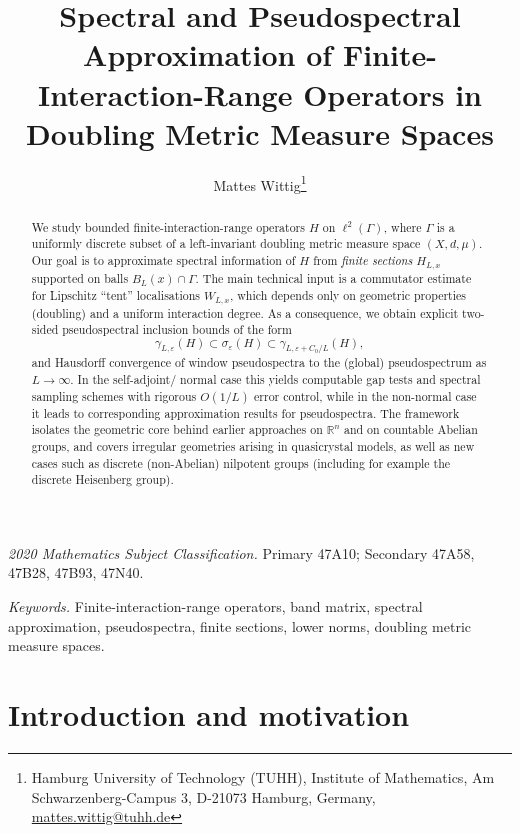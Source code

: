 \documentclass[11pt]{article}
\title{Spectral and Pseudospectral Approximation of Finite-Interaction-Range Operators in Doubling Metric Measure Spaces}
\author{Mattes Wittig\thanks{
  Hamburg University of Technology (TUHH), Institute of Mathematics, Am Schwarzenberg-Campus 3, D-21073 Hamburg, Germany, \href{mailto:mattes.wittig@tuhh.de}{mattes.wittig@tuhh.de}
}}
\date{}
\theoremstyle{definition}
\newcommand{\R}{\mathbb{R}}
\begin{document}
\maketitle

\begin{abstract}
We study bounded finite-interaction-range operators $H$ on $\ell^2(\Gamma)$, where $\Gamma$ is a uniformly discrete subset of a left-invariant doubling metric measure space $(X,d,\mu)$. Our goal is to approximate spectral information of $H$ from \emph{finite sections} $H_{L,x}$ supported on balls $B_L(x)\cap\Gamma$. The main technical input is a commutator estimate for Lipschitz ``tent'' localisations $W_{L,x}$, which depends only on geometric properties (doubling) and a uniform interaction degree. As a consequence, we obtain explicit two-sided pseudospectral inclusion bounds of the form
\[
  \gamma_{L,\varepsilon}(H)\subset \sigma_\varepsilon(H)\subset \gamma_{L,\varepsilon+C_0/L}(H),
\]
and Hausdorff convergence of window pseudospectra to the (global) pseudospectrum as $L\to\infty$. In the self-adjoint/ normal case this yields computable gap tests and spectral sampling schemes with rigorous $O(1/L)$ error control, while in the non-normal case it leads to corresponding approximation results for pseudospectra. The framework isolates the geometric core behind earlier approaches on $\R^n$ and on countable Abelian groups, and covers irregular geometries arising in quasicrystal models, as well as new cases such as discrete (non-Abelian) nilpotent groups (including for example the discrete Heisenberg group).
\end{abstract}


{\small
\noindent
\textit{2020 Mathematics Subject Classification.}
Primary 47A10; Secondary 47A58, 47B28, 47B93, 47N40.

\smallskip

\noindent
\textit{Keywords.}
Finite-interaction-range operators, band matrix, spectral approximation,
pseudospectra, finite sections, lower norms,
doubling metric measure spaces.
}

\section{Introduction and motivation}
\end{document}
